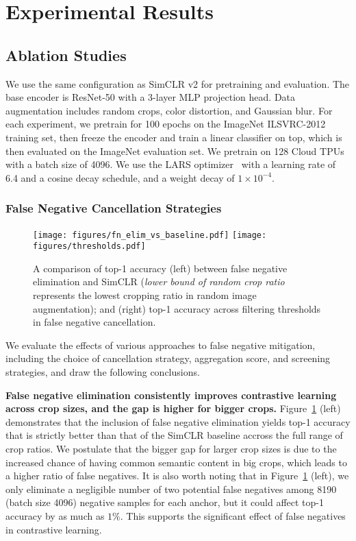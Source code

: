 \documentclass[10pt,twocolumn,letterpaper]{article}
\begin{document}
 \section{Experimental Results}
\label{sec:experiments}



\subsection{Ablation Studies}

We use the same configuration as SimCLR v2 for pretraining and evaluation. The base encoder is ResNet-50 with a 3-layer MLP projection head. Data augmentation includes random crops, color distortion, and Gaussian blur. For each experiment, we pretrain for 100 epochs on the ImageNet ILSVRC-2012 training set, then freeze the encoder and train a linear classifier on top, which is then evaluated on the ImageNet evaluation set. We pretrain on 128 Cloud TPUs with a batch size of 4096. We use the LARS optimizer~\cite{ginsburg2018large} with a learning rate of 6.4 and a cosine decay schedule, and a weight decay of $1 \times 10^{-4}$.

\subsubsection{False Negative Cancellation Strategies}

\begin{figure}[!t]
    \centering
    \texttt{[image: figures/fn\_elim\_vs\_baseline.pdf]} \hfil
\texttt{[image: figures/thresholds.pdf]}
\caption{A comparison of top-1 accuracy (left) between false negative elimination and SimCLR (\emph{lower bound of random crop ratio} represents the lowest cropping ratio in random image augmentation); and (right) top-1 accuracy across filtering thresholds in false negative cancellation.}\label{fig:top1_accuracy}
    \vspace{-5pt}
\end{figure}
We evaluate the effects of various approaches to false negative mitigation, including the choice of cancellation strategy, aggregation score, and screening strategies, and draw the following conclusions.

\textbf{False negative elimination consistently improves contrastive learning across crop sizes, and the gap is higher for bigger crops.} Figure~\ref{fig:top1_accuracy} (left) demonstrates that the inclusion of false negative elimination yields top-1 accuracy that is strictly better than that of the SimCLR baseline accross the full range of crop ratios. We postulate that the bigger gap for larger crop sizes is due to the increased chance of having common semantic content in big crops, which leads to a higher ratio of false negatives. It is also worth noting that in Figure~\ref{fig:top1_accuracy} (left), we only eliminate a negligible number of two potential false negatives among 8190 (batch size 4096) negative samples for each anchor, but it could affect top-1 accuracy by as much as $1\%$. This supports the significant effect of false negatives in contrastive learning.
\end{document}
